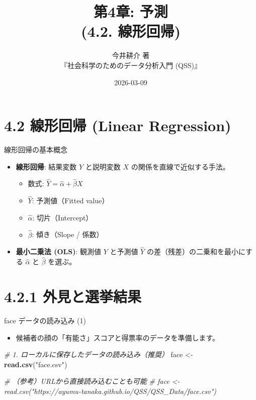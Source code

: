 \documentclass[
  ignorenonframetext,
]{beamer}
\title{第4章: 予測\\
(4.2. 線形回帰)}
\subtitle{今井耕介 著\\
『社会科学のためのデータ分析入門 (QSS)』}
\author{}
\date{\vspace{-2.5em}2026-03-09}
\newenvironment{Shaded}{\begin{snugshade}}{\end{snugshade}}
\newcommand{\CommentTok}[1]{\textcolor[rgb]{0.56,0.35,0.01}{\textit{#1}}}
\newcommand{\FunctionTok}[1]{\textcolor[rgb]{0.13,0.29,0.53}{\textbf{#1}}}
\newcommand{\NormalTok}[1]{#1}
\newcommand{\OtherTok}[1]{\textcolor[rgb]{0.56,0.35,0.01}{#1}}
\newcommand{\StringTok}[1]{\textcolor[rgb]{0.31,0.60,0.02}{#1}}
\providecommand{\tightlist}{%
  \setlength{\itemsep}{0pt}\setlength{\parskip}{0pt}}
\begin{document}
\frame{\titlepage}

\section{4.2 線形回帰 (Linear
Regression)}\label{ux7ddaux5f62ux56deux5e30-linear-regression}

\begin{frame}{線形回帰の基本概念}
\label{ux7ddaux5f62ux56deux5e30ux306eux57faux672cux6982ux5ff5}
\begin{itemize}
\tightlist
\item
  \textbf{線形回帰}: 結果変数 \(Y\) と説明変数 \(X\)
  の関係を直線で近似する手法。

  \begin{itemize}
  \tightlist
  \item
    数式: \(\hat{Y} = \hat{\alpha} + \hat{\beta} X\)
  \item
    \(\hat{Y}\): 予測値（Fitted value）
  \item
    \(\hat{\alpha}\): 切片（Intercept）
  \item
    \(\hat{\beta}\): 傾き（Slope / 係数）
  \end{itemize}
\item
  \textbf{最小二乗法 (OLS)}: 観測値 \(Y\) と予測値 \(\hat{Y}\)
  の差（残差）の二乗和を最小にする \(\hat{\alpha}\) と \(\hat{\beta}\)
  を選ぶ。
\end{itemize}
\end{frame}

\section{4.2.1
外見と選挙結果}\label{ux5916ux898bux3068ux9078ux6319ux7d50ux679c}

\begin{frame}[fragile]{face データの読み込み (1)}
\label{face-ux30c7ux30fcux30bfux306eux8aadux307fux8fbcux307f-1}
\begin{itemize}
\tightlist
\item
  候補者の顔の「有能さ」スコアと得票率のデータを準備します。
\end{itemize}

\scriptsize

\begin{Shaded}
\begin{Highlighting}[]
\CommentTok{\# 1. ローカルに保存したデータの読み込み（推奨）}
\NormalTok{face }\OtherTok{\textless{}{-}} \FunctionTok{read.csv}\NormalTok{(}\StringTok{"face.csv"}\NormalTok{)}

\CommentTok{\# （参考）URLから直接読み込むことも可能}
\CommentTok{\# face \textless{}{-} read.csv("https://ayumu{-}tanaka.github.io/QSS/QSS\_Data/face.csv")}
\end{Highlighting}
\end{Shaded}

\normalsize
\end{frame}
\end{document}
